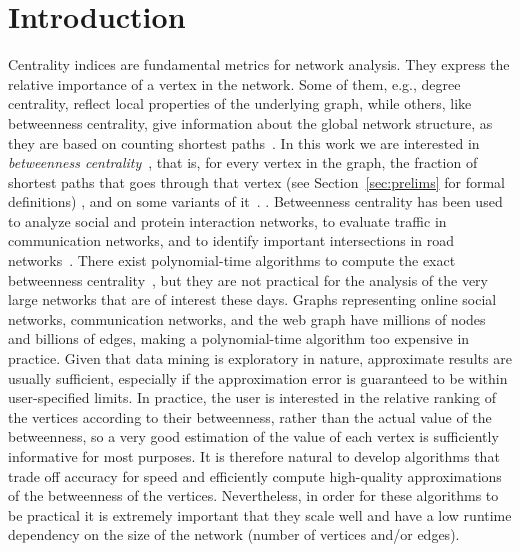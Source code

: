 \section{Introduction}\label{sec:intro}
Centrality indices are fundamental metrics for network analysis. They express the
relative importance of a vertex in the network. Some of them, e.g., degree
centrality, reflect local properties of the underlying graph, while others,
like betweenness centrality, give information about the global network
structure, as they are based on counting shortest paths~\citep{Newman10}. In
this work we are interested in \emph{betweenness
centrality}~\citep{Anthonisse71,Freeman77}, that is, for every vertex in the
graph, the fraction of shortest paths that goes through that vertex (see
Section~\ref{sec:prelims} for formal definitions)
\ifproof
, and on some variants of it~\citep{OpsahlAS10,BorgattiE06,Brandes08}. %
\else
. %
\fi
Betweenness centrality has been used to analyze social and protein interaction
networks, to evaluate traffic in communication networks, and to identify
important intersections in road networks~\citep{Newman10,GeisbergerSS08}. There
exist polynomial-time algorithms to compute the exact betweenness
centrality~\citep{Brandes01}, but they are not practical for the analysis of the
very large networks that are of interest these days. Graphs representing online
social networks, communication networks, and the web graph have millions of
nodes and billions of edges, making a polynomial-time algorithm too expensive in
practice. Given that data mining is exploratory in nature, approximate results
are usually sufficient, especially if the approximation error is guaranteed to
be within user-specified limits. In practice, the user is interested in the
relative ranking of the vertices according to their betweenness, rather than the
actual value of the betweenness, so a very good estimation of the value of each
vertex is sufficiently informative for most purposes. It is therefore natural to
develop algorithms that trade off accuracy for speed and efficiently compute
high-quality approximations of the betweenness of the vertices.  Nevertheless,
in order for these algorithms to be practical it is extremely important that
they scale well and have a low runtime dependency on the size of the network
(number of vertices and/or edges).

